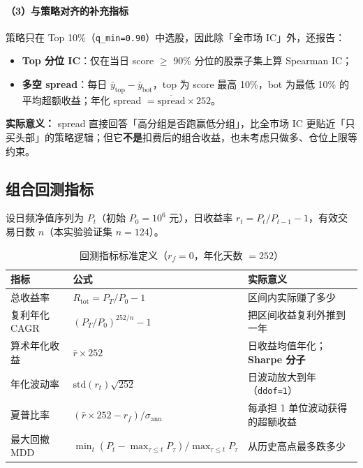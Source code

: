 \documentclass[UTF8,a4paper,12pt]{ctexart}
\begin{document}
\paragraph{（3）与策略对齐的补充指标}

策略只在 Top 10\%（\texttt{q\_min=0.90}）中选股，因此除「全市场 IC」外，还报告：
\begin{itemize}[leftmargin=2em]
  \item \textbf{Top 分位 IC}：仅在当日 score $\ge$ 90\% 分位的股票子集上算 Spearman IC；
  \item \textbf{多空 spread}：每日 $\bar{y}_{\mathrm{top}}-\bar{y}_{\mathrm{bot}}$，top 为 score 最高 10\%，bot 为最低 10\% 的平均超额收益；年化 spread $=\overline{\mathrm{spread}}\times 252$。
\end{itemize}

\textbf{实际意义：} spread 直接回答「高分组是否跑赢低分组」，比全市场 IC 更贴近「只买头部」的策略逻辑；但它\textbf{不是}扣费后的组合收益，也未考虑只做多、仓位上限等约束。

\subsection{组合回测指标}

设日频净值序列为 $P_t$（初始 $P_0=10^6$ 元），日收益率 $r_t=P_t/P_{t-1}-1$，有效交易日数 $n$（本实验验证集 $n=124$）。

\begin{table}[H]
\centering
\caption{回测指标标准定义（$r_f=0$，年化天数 $=252$）}
\label{tab:metric-def}
\begin{tabular}{llp{5.8cm}}
\toprule
\textbf{指标} & \textbf{公式} & \textbf{实际意义} \\
\midrule
总收益率 & $R_{\mathrm{tot}}=P_T/P_0-1$ & 区间内实际赚了多少 \\
复利年化 CAGR & $(P_T/P_0)^{252/n}-1$ & 把区间收益复利外推到一年 \\
算术年化收益 & $\bar{r}\times 252$ & 日收益均值年化；\textbf{Sharpe 分子} \\
年化波动率 & $\mathrm{std}(r_t)\sqrt{252}$ & 日波动放大到年（\texttt{ddof=1}） \\
夏普比率 & $(\bar{r}\times 252-r_f)/\sigma_{\mathrm{ann}}$ & 每承担 1 单位波动获得的超额收益 \\
最大回撤 MDD & $\min_t (P_t-\max_{\tau\le t}P_\tau)/\max_{\tau\le t}P_\tau$ & 从历史高点最多跌多少 \\
\bottomrule
\end{tabular}
\end{table}
\end{document}
